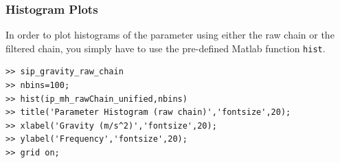 \subsubsection{Histogram Plots}

In order to plot histograms of the parameter using either the raw chain or the filtered chain, you simply have to use the pre-defined Matlab function \verb+hist+.
%
\begin{lstlisting}[label=matlab:hist,caption={Matlab code for the histogram plot.}]
% inside Matlab
>> sip_gravity_raw_chain
>> nbins=100;
>> hist(ip_mh_rawChain_unified,nbins)
>> title('Parameter Histogram (raw chain)','fontsize',20);
>> xlabel('Gravity (m/s^2)','fontsize',20);
>> ylabel('Frequency','fontsize',20);
>> grid on;
\end{lstlisting}

